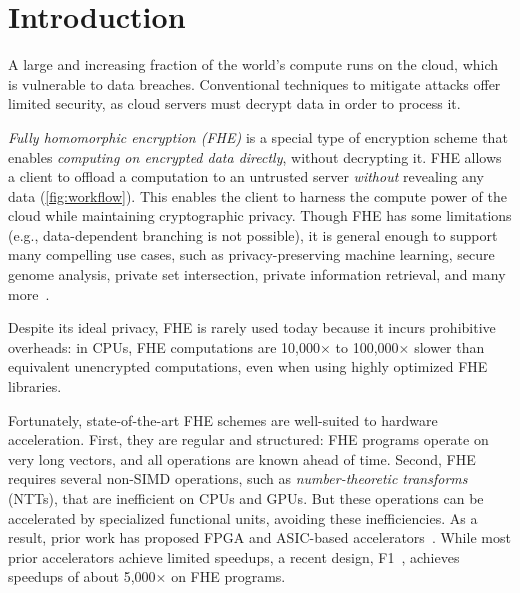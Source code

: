 \chapter{Introduction}\label{sec:intro}

A large and increasing fraction of the world's compute runs on the cloud,
which is vulnerable to data breaches.
Conventional techniques to mitigate attacks offer limited 
security, as cloud servers must decrypt data in order to process it.

\emph{Fully homomorphic encryption (FHE)} is a special type of encryption scheme
that enables \emph{computing on encrypted data directly}, without decrypting it.
FHE allows a client to offload a computation
to an untrusted server \emph{without} revealing any data (\autoref{fig:workflow}).
This enables the client to harness the compute power of the cloud while maintaining cryptographic privacy.
Though FHE has some limitations (e.g., data-dependent branching is not possible), 
it is general enough to support many compelling use cases,
such as privacy-preserving machine learning, secure genome analysis, private set intersection,
private information retrieval, and many more~\cite{kim2020semi,gilad:icml16:cryptonets,han:aaai19:logistic,han:iacr18:efficient,juvekar2018gazelle,DBLP:conf/ccs/ChenLR17,DBLP:conf/tcc/GentryH19}. 

Despite its ideal privacy, FHE is rarely used today because it incurs prohibitive overheads:
in CPUs, FHE computations are 10,000$\times$ to 100,000$\times$
slower than equivalent unencrypted computations, even when using highly optimized FHE libraries.

Fortunately, state-of-the-art FHE schemes are well-suited to hardware acceleration.
First, they are regular and structured:
FHE programs operate on very long vectors, and all operations are known ahead of time.
Second, FHE requires several non-SIMD operations,
such as \emph{number-theoretic transforms} (NTTs),
that are inefficient on CPUs and GPUs.
But these operations can be accelerated by specialized functional units,
avoiding these inefficiencies.
As a result, prior work has proposed FPGA and ASIC-based
accelerators~\cite{riazi:asplos20:heax,cousins:hpec12:sipher-fpga,cousins:tetc17:fpga-he,turan:tc20:heaws,cousins:hpec14:fpga-he, roy:hpca19:fpga-he,feldmann:micro21:f1}.
While most prior accelerators achieve limited speedups, a recent design,
F1~\cite{feldmann:micro21:f1}, achieves speedups of
about 5,000$\times$
on FHE programs.

